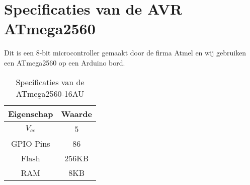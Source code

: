 \documentclass{scrreprt} %
\begin{document}
\section {Specificaties van de AVR ATmega2560}
Dit is een 8-bit microcontroller gemaakt door de firma Atmel en wij gebruiken een ATmega2560 op een Arduino bord.
\begin{table}[H]
\centering
\caption{Specificaties van de ATmega2560-16AU}
\label{tab:spec-avr}
\begin{tabular}{c c}
	\hline\hline
 	Eigenschap & Waarde\\
 	\hline
	$V_{cc}$ & 5\volt \\
	GPIO Pins & 86 \\
	Flash & 256KB \\
	RAM & 8KB \\
  	\hline
\end{tabular}
\end{table}
\end{document}
